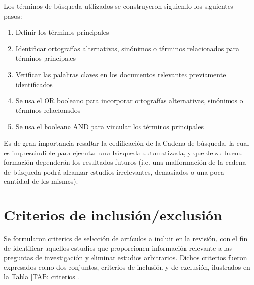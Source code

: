 Los términos de búsqueda utilizados se construyeron siguiendo los siguientes pasos:
\begin{enumerate}
    \item Definir los términos principales
    \item Identificar ortografías alternativas, sinónimos o términos relacionados para términos principales
    \item Verificar las palabras claves en los documentos relevantes previamente identificados
    \item Se usa el OR booleano para incorporar ortografías alternativas, sinónimos o términos relacionados
    \item Se usa el booleano AND para vincular los términos principales
\end{enumerate}


Es de gran importancia resaltar la codificación de la Cadena de búsqueda, la cual es imprescindible para ejecutar una búsqueda automatizada, y que de su buena formación dependerán los resultados futuros (i.e. una malformación de la cadena de búsqueda podrá alcanzar estudios irrelevantes, demasiados o una poca cantidad de los mismos). 
\newline
\noindent{}

\section{Criterios de inclusión/exclusión}

Se formularon criterios de selección de artículos a incluir en la revisión, con el fin de identificar aquellos estudios que proporcionen información relevante a las preguntas de investigación y eliminar estudios arbitrarios. Dichos criterios fueron expresados como dos conjuntos, criterios de inclusión y de exclusión, ilustrados en la Tabla \ref{TAB: criterios}.


